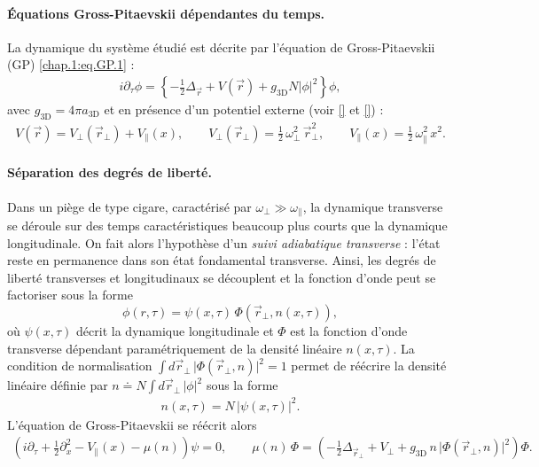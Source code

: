 \paragraph{Équations Gross-Pitaevskii dépendantes du temps.}
La dynamique du système étudié est décrite par l’équation de Gross-Pitaevskii (GP) \eqref{chap.1:eq.GP.1} :
\begin{eqnarray*}
	i \partial_\tau\phi = \left \{ - \frac{1}{2}\Delta_{\vec{r}} + V(\vec{r}) + g_{\mathrm{3D}} N \vert \phi \vert^2 \right \} \phi,
\end{eqnarray*}
avec $g_{\mathrm{3D}} = 4 \pi a_{\mathrm{3D}}$ et en présence d’un potentiel externe (voir \eqref{} et \eqref{}) :
\begin{eqnarray*}
	V(\vec{r}) = V_\perp(\vec{r}_\perp) + V_\parallel(x), 
	\qquad 
	V_\perp(\vec{r}_\perp) = \tfrac{1}{2} \, \omega_\perp^2 \, \vec{r}_\perp^2, 
	\qquad 
	V_\parallel(x) = \tfrac{1}{2} \, \omega_\parallel^2 \, x^2.
\end{eqnarray*} 


\paragraph{Séparation des degrés de liberté.}
Dans un piège de type cigare, caractérisé par $\omega_\perp \gg \omega_\parallel$, la dynamique transverse se déroule sur des temps caractéristiques beaucoup plus courts que la dynamique longitudinale. On fait alors l’hypothèse d’un \emph{suivi adiabatique transverse} : l’état reste en permanence dans son état fondamental transverse. Ainsi, les degrés de liberté transverses et longitudinaux se découplent et la fonction d’onde peut se factoriser sous la forme
\begin{equation}
    \phi(r,\tau) = \psi(x,\tau)\,\Phi\!\left(\vec{r}_\perp, n(x,\tau)\right),
\end{equation}
où $\psi(x,\tau)$ décrit la dynamique longitudinale et $\Phi$ est la fonction d’onde transverse dépendant paramétriquement de la densité linéaire $n(x,\tau)$. La condition de normalisation 
\(
\int d \vec{r}_\perp \, \big|\Phi\!\left(\vec{r}_\perp, n\right)\big|^2 = 1
\)
permet de réécrire la densité linéaire définie par 
\(
n \doteq N \int d \vec{r}_\perp \, |\phi|^2
\)
sous la forme
\begin{eqnarray*}
	n(x,\tau) = N \, |\psi(x,\tau)|^2.
\end{eqnarray*}
L’équation de Gross-Pitaevskii se réécrit alors
\begin{eqnarray}
	\left( i \partial_\tau + \tfrac{1}{2} \partial_x^2 - V_\parallel(x) - \mu(n) \right) \psi = 0, 
	\qquad 
	\mu(n)\,\Phi = \left( - \tfrac{1}{2} \Delta_{\vec{r}_\perp} + V_\perp + g_{\mathrm{3D}} \, n \, \big|\Phi(\vec{r}_\perp,n)\big|^2 \right)\Phi.
\end{eqnarray}

